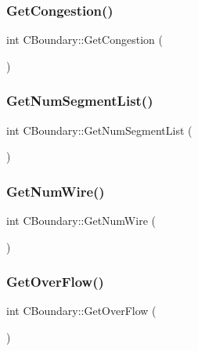 \subsubsection{\texorpdfstring{GetCongestion()}{GetCongestion()}}
{\footnotesize\ttfamily int C\+Boundary\+::\+Get\+Congestion (\begin{DoxyParamCaption}{ }\end{DoxyParamCaption})}

\mbox{\label{classCBoundary_ac1b6d9afabe595f1ae4123d4ffd27813}} 
\subsubsection{\texorpdfstring{GetNumSegmentList()}{GetNumSegmentList()}}
{\footnotesize\ttfamily int C\+Boundary\+::\+Get\+Num\+Segment\+List (\begin{DoxyParamCaption}{ }\end{DoxyParamCaption})}

\mbox{\label{classCBoundary_afcecb6cf9aae108be1751b34e85e3679}} 
\subsubsection{\texorpdfstring{GetNumWire()}{GetNumWire()}}
{\footnotesize\ttfamily int C\+Boundary\+::\+Get\+Num\+Wire (\begin{DoxyParamCaption}{ }\end{DoxyParamCaption})}

\mbox{\label{classCBoundary_a1b1c06eca11d35d0b6f3b1cc9cd8d299}} 
\subsubsection{\texorpdfstring{GetOverFlow()}{GetOverFlow()}}
{\footnotesize\ttfamily int C\+Boundary\+::\+Get\+Over\+Flow (\begin{DoxyParamCaption}{ }\end{DoxyParamCaption})}

\mbox{\label{classCBoundary_aaa09500786bfd880681cbd98700cd9f7}} 
